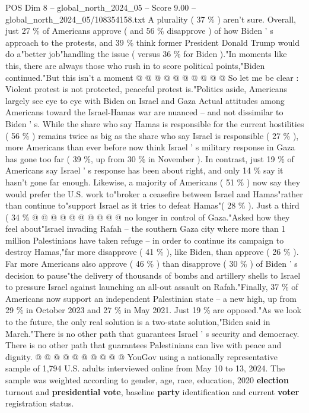 \begin{textsample}{POS Dim 8 – global\_north\_2024\_05 – Score 9.00 – global\_north\_2024\_05/108354158.txt}
A plurality ( 37 \% ) aren't sure.
Overall, just 27 \% of Americans approve ( and 56 \% disapprove ) of how Biden ' s approach to the protests, and 39 \% think former President Donald Trump would do a"better job"handling the issue ( versus 36 \% for Biden )."In moments like this, there are always those who rush in to score political points,"Biden continued."But this isn't a moment @ @ @ @ @ @ @ @ @ @ So let me be clear : Violent protest is not protected, peaceful protest is."Politics aside, Americans largely see eye to eye with Biden on Israel and Gaza Actual attitudes among Americans toward the Israel-Hamas war are nuanced -- and not dissimilar to Biden ' s.
While the share who say Hamas is responsible for the current hostilities ( 56 \% ) remains twice as big as the share who say Israel is responsible ( 27 \% ), more Americans than ever before now think Israel ' s military response in Gaza has gone too far ( 39 \%, up from 30 \% in November ).
In contrast, just 19 \% of Americans say Israel ' s response has been about right, and only 14 \% say it hasn't gone far enough.
Likewise, a majority of Americans ( 51 \% ) now say they would prefer the U.S. work to"broker a ceasefire between Israel and Hamas"rather than continue to"support Israel as it tries to defeat Hamas"( 28 \% ).
Just a third ( 34 \% @ @ @ @ @ @ @ @ @ @ no longer in control of Gaza."Asked how they feel about"Israel invading Rafah -- the southern Gaza city where more than 1 million Palestinians have taken refuge -- in order to continue its campaign to destroy Hamas,"far more disapprove ( 41 \% ), like Biden, than approve ( 26 \% ).
Far more Americans also approve ( 46 \% ) than disapprove ( 30 \% ) of Biden ' s decision to pause"the delivery of thousands of bombs and artillery shells to Israel to pressure Israel against launching an all-out assault on Rafah."Finally, 37 \% of Americans now support an independent Palestinian state -- a new high, up from 29 \% in October 2023 and 27 \% in May 2021.
Just 19 \% are opposed."As we look to the future, the only real solution is a two-state solution,"Biden said in March."There is no other path that guarantees Israel ' s security and democracy.
There is no other path that guarantees Palestinians can live with peace and dignity. @ @ @ @ @ @ @ @ @ @ YouGov using a nationally representative sample of 1,794 U.S. adults interviewed online from May 10 to 13, 2024.
The sample was weighted according to gender, age, race, education, 2020 \textbf{election} turnout and \textbf{presidential} \textbf{vote}, baseline \textbf{party} identification and current \textbf{voter} registration status.

\end{textsample}
